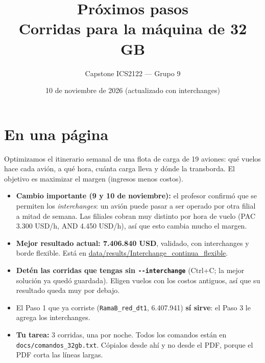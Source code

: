 \documentclass[11pt,a4paper]{article}
\title{\textbf{Próximos pasos}\\[4pt]
  \large Corridas para la máquina de 32 GB}
\author{Capstone ICS2122 --- Grupo 9}
\date{10 de noviembre de 2026 (actualizado con interchanges)}
\begin{document}
\maketitle

\section*{En una página}

Optimizamos el itinerario semanal de una flota de carga de 19 aviones: qué vuelos hace cada avión, a qué hora, cuánta carga lleva y dónde la transborda. El objetivo es maximizar el margen (ingresos menos costos).

\begin{itemize}
  \item \textbf{Cambio importante (9 y 10 de noviembre):} el profesor confirmó que se permiten los \emph{interchanges}: un avión puede pasar a ser operado por otra filial a mitad de semana. Las filiales cobran muy distinto por hora de vuelo (PAC 3.300 USD/h, AND 4.450 USD/h), así que esto cambia mucho el margen.
  \item \textbf{Mejor resultado actual: 7.406.840 USD}, validado, con interchanges y borde flexible. Está en \url{data/results/Interchange_continua_flexible}.
  \item \textbf{Detén las corridas que tengas sin \texttt{-{}-interchange}} (Ctrl+C; la mejor solución ya quedó guardada). Eligen vuelos con los costos antiguos, así que su resultado queda muy por debajo.
  \item El Paso 1 que ya corriste (\texttt{RamaB\_red\_dt1}, 6.407.941) \textbf{sí sirve}: el Paso 3 le agrega los interchanges.
  \item \textbf{Tu tarea:} 3 corridas, una por noche. Todos los comandos están en \texttt{docs/comandos\_32gb.txt}. Cópialos desde ahí y no desde el PDF, porque el PDF corta las líneas largas.
\end{itemize}
\end{document}
